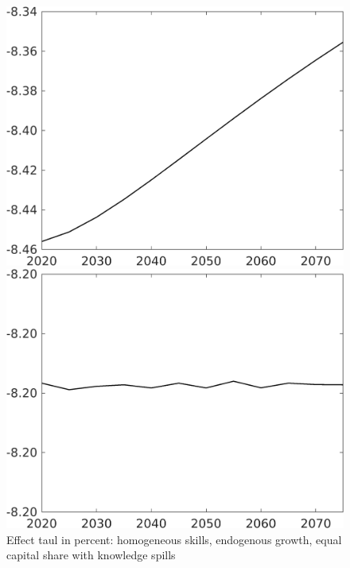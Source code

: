\documentclass[12pt]{article}
\begin{document}
\begin{figure}[h!!]
	\centering
	\caption{Effect taul in percent: homogeneous skills, endogenous growth, equal capital share with knowledge spills}\label{fig:LF_BAU_nsk1_xgr0_equalcapShare_know}
	\begin{minipage}[]{0.32\textwidth}
		\includegraphics[width=1\textwidth]{../../codding_model/own_basedOnFried/optimalPol_010922_revision/figures/all_13Sept22/CompTaul_Equlab_LFBAUPer_Reg0_Emnet_spillover0_nsk1_xgr0_knspil0_sep1_countec0_GovRev0_etaa0.79.png}
	\end{minipage}	
	\begin{minipage}[]{0.32\textwidth}
		\includegraphics[width=1\textwidth]{../../codding_model/own_basedOnFried/optimalPol_010922_revision/figures/all_13Sept22/CompTaul_Equlab_LFBAUPer_Reg0_hh_spillover0_nsk1_xgr0_knspil0_sep1_countec0_GovRev0_etaa0.79.png}

\end{minipage}
\end{figure}
\end{document}
